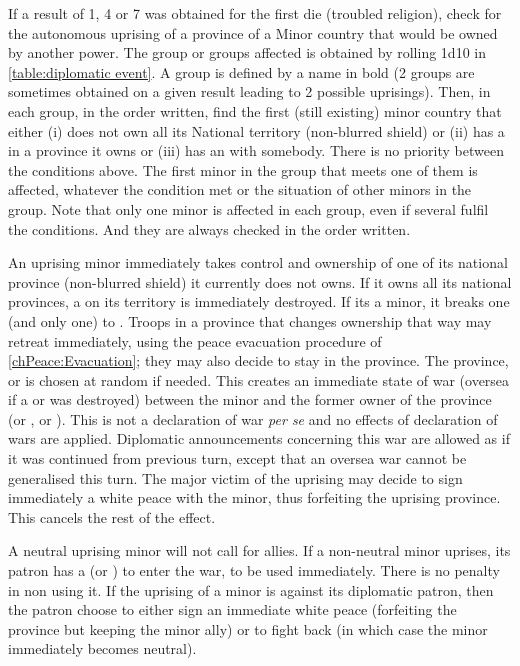  \label{chEvents:diplomacy:uprising} If a result of 1, 4 or 7
was obtained for the first die (troubled religion), check for the
autonomous uprising of a province of a Minor country that would be owned
by another power.
\bparag The group or groups affected is obtained by rolling 1d10 in
\ref{table:diplomatic event}. A group is defined by a name in bold (2
groups are sometimes obtained on a given result leading to 2 possible
uprisings).
\bparag Then, in each group, in the order written, find the first
(still existing) minor country that either (i) does not own all its
National territory (non-blurred shield) or (ii) has a \Presidio in a
province it owns or (iii) has an \dipAT with somebody.
\bparag There is no priority between the conditions above. The first
minor in the group that meets one of them is affected, whatever the
condition met or the situation of other minors in the group.
\bparag Note that only one minor is affected in each group, even if
several fulfil the conditions. And they are always checked in the
order written.

\bparag An uprising minor immediately takes control and ownership of
one of its national province (non-blurred shield) it currently does
not owns. If it owns all its national provinces, a \Presidio on its
territory is immediately destroyed. If its a \ROTW minor, it breaks
one (and only one) \dipAT to \dipNR.
\bparag Troops in a province that changes ownership that way may
retreat immediately, using the peace evacuation procedure of
\ref{chPeace:Evacuation}; they may also decide to stay in the
province.
\bparag The province, \Presidio or \dipAT is chosen at random if
needed.
\bparag This creates an immediate state of war (oversea if a \Presidio
or \dipAT was destroyed) between the minor and the former owner of the
province (or \Presidio, or \dipAT).
\bparag This is not a declaration of war \emph{per se} and no effects
of declaration of wars are applied.
\bparag Diplomatic announcements concerning this war are allowed as if
it was continued from previous turn, except that an oversea war cannot
be generalised this turn.
\bparag The major victim of the uprising may decide to sign
immediately a white peace with the minor, thus forfeiting the uprising
province. This cancels the rest of the effect.

\bparag A neutral uprising minor will not call for allies.
\bparag If a non-neutral minor uprises, its patron has a \CB (or \OCB)
to enter the war, to be used immediately. There is no penalty in non
using it.
\bparag If the uprising of a minor is against its diplomatic patron,
then the patron choose to either sign an immediate white peace
(forfeiting the province but keeping the minor ally) or to fight back
(in which case the minor immediately becomes neutral).

